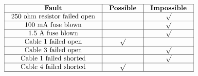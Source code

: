 






$$\vbox{\offinterlineskip
\halign{\strut
\vrule \quad\hfil # \ \hfil & 
\vrule \quad\hfil # \ \hfil & 
\vrule \quad\hfil # \ \hfil \vrule \cr
\noalign{\hrule}
%
{\bf Fault} & {\bf Possible} & {\bf Impossible} \cr
%
\noalign{\hrule}
%
250 ohm resistor failed open &  & $\surd$ \cr
%
\noalign{\hrule}
%
100 mA fuse blown &  & $\surd$ \cr
%
\noalign{\hrule}
%
1.5 A fuse blown &  & $\surd$ \cr
%
\noalign{\hrule}
%
Cable 1 failed open & $\surd$ &  \cr
%
\noalign{\hrule}
%
Cable 3 failed open &  & $\surd$ \cr
%
\noalign{\hrule}
%
Cable 1 failed shorted &  & $\surd$ \cr
%
\noalign{\hrule}
%
Cable 4 failed shorted & $\surd$ &  \cr
%
\noalign{\hrule}
} %
}$$ %











